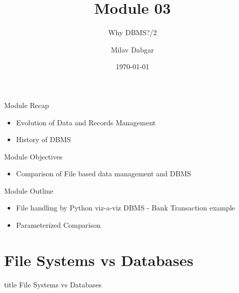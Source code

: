\documentclass[aspectratio=169, xcolor=dvipsnames]{beamer}
\title{Module 03}
\subtitle{Why DBMS?/2}
\author{Milav Dabgar}
\institute{www.milav.in}
\date{\today}
\begin{document}
\begin{frame}
    \titlepage
\end{frame}

\begin{frame}{Module Recap}
    \begin{itemize}
        \item Evolution of Data and Records Management
        \item History of DBMS
    \end{itemize}
\end{frame}

\begin{frame}{Module Objectives}
    \begin{itemize}
        \item Comparison of File based data management and DBMS
    \end{itemize}
\end{frame}

\begin{frame}{Module Outline}
    \begin{itemize}[<+->]
        \item File handling by Python viz-a-viz DBMS - Bank Transaction example
        \item Parameterized Comparison
    \end{itemize}
\end{frame}

\section{File Systems vs Databases}

\begin{frame}
  \vfill
  \centering
  \begin{beamercolorbox}[sep=8pt,center,shadow=true,rounded=true]{title}
    File Systems vs Databases\par%
  \end{beamercolorbox}
  \vfill
\end{frame}
\end{document}
